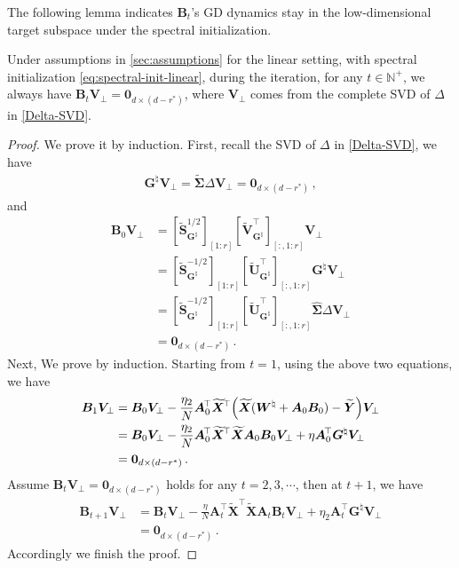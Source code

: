 The following lemma indicates $\bm B_t$'s GD dynamics stay in the low-dimensional target subspace under the spectral initialization.
\begin{lemma}
\label{linear-invariant-B2}
Under assumptions in \cref{sec:assumptions} for the linear setting, with spectral initialization \eqref{eq:spectral-init-linear}, during the iteration, for any $t\in\mathbb{N}^{+}$, we always have $\bm B_t \bm V_\perp = \bm 0_{d\times (d-r^*)}$, where $\bm V_\perp$ comes from the complete SVD of $\Delta$ in \cref{Delta-SVD}.
\end{lemma}
\begin{proof}
We prove it by induction.
First, recall the SVD of $\Delta$ in \cref{Delta-SVD}, we have
    \begin{align*}
        {\bm G}^{\natural} \bm V_\perp = \widetilde{\bm \Sigma}\Delta \bm V_\perp = \bm 0_{d\times (d-r^*)}\,,
    \end{align*}
    and
    \begin{align*}
        \bm B_0 \bm V_\perp & = \left[\widetilde{\bm S}_{\bm G^\natural}^{1/2}\right]_{[1:r]}\left[\widetilde{\bm V}_{\bm G^\natural}^{\!\top}\right]_{[:,1:r]}\bm V_\perp\\
        & = \left[\widetilde{\bm S}_{\bm G^\natural}^{-1/2}\right]_{[1:r]}\left[\widetilde{\bm U}_{\bm G^\natural}^{\!\top}\right]_{[:,1:r]}{\bm G}^{\natural} \bm V_\perp \\
        & = \left[\widetilde{\bm S}_{\bm G^\natural}^{-1/2}\right]_{[1:r]}\left[\widetilde{\bm U}_{\bm G^\natural}^{\!\top}\right]_{[:,1:r]}\widehat{\bm \Sigma}\Delta \bm V_\perp\\
        & = \bm 0_{d\times (d-r^*)}\,.
    \end{align*}
    Next, We prove by induction. Starting from $t = 1$, using the above two equations, we have
    \begin{align*}
        \bm B_1 \bm V_\perp 
        & = \bm B_0 \bm V_\perp -\frac{\eta_2}{N} \bm A^{\!\top}_0 \widetilde{\bm X}^{\!\top} \Bigl(\widetilde{\bm X} (\bm W^\natural+\bm A_0 \bm B_0) - \widetilde{\bm Y}\Bigr)\bm V_\perp\\
        & = \bm B_0 \bm V_\perp - \frac{\eta_2}{N} \bm A^{\!\top}_0 \widetilde{\bm X}^{\!\top} \widetilde{\bm X} \bm A_0 \bm B_0\bm V_\perp + \eta \bm A^{\!\top}_0 {\bm G}^{\natural} \bm V_\perp\\
        & = \bm 0_{d\times (d-r^*)}\,.
    \end{align*}
    Assume $\bm B_t {\bm V_\perp} = \bm 0_{d\times (d-r^*)}$ holds for any  $t= 2,3,\cdots$, then at $t+1$, we have
    \begin{align*}
         \bm B_{t+1} \bm V_\perp
        & = \bm B_t \bm V_\perp - \frac{\eta}{N} \bm A^{\!\top}_t \widetilde{\bm X}^{\!\top} \widetilde{\bm X} \bm A_t \bm B_t\bm V_\perp + \eta_2 \bm A^{\!\top}_t {\bm G}^{\natural} \bm V_\perp\\
        & = \bm 0_{d\times (d-r^*)}\,.
    \end{align*}
    Accordingly we finish the proof.
\end{proof}
